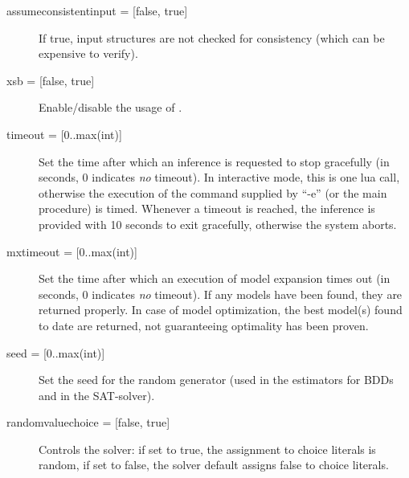 \begin{description}
	\item[{assumeconsistentinput = [false, true]}] If true, input structures are not checked for consistency (which can be expensive to verify). 
	\item[{xsb = [false, true]}] Enable/disable the usage of \xsb.
	\item[{timeout = [0..max(int)]}] Set the time after which an inference is requested to stop gracefully (in seconds, 0 indicates \emph{no} timeout).
		In interactive mode, this is one lua call, otherwise the execution of the command supplied by ``-e'' (or the main procedure) is timed.
		Whenever a timeout is reached, the inference is provided with 10 seconds to exit gracefully, otherwise the system aborts.				
	\item[{mxtimeout = [0..max(int)]}] Set the time after which an execution of model expansion times out (in seconds, 0 indicates \emph{no} timeout).
		If any models have been found, they are returned properly.
		In case of model optimization, the best model(s) found to date are returned, not guaranteeing optimality has been proven. 
	\item[{seed = [0..max(int)]}] Set the seed for the random generator (used in the estimators for BDDs and in the SAT-solver).
	\item[{randomvaluechoice = [false, true]}] Controls the solver: if set to true, the assignment to choice literals is random, if set to false, the solver default assigns false to choice literals.
\end{description}
